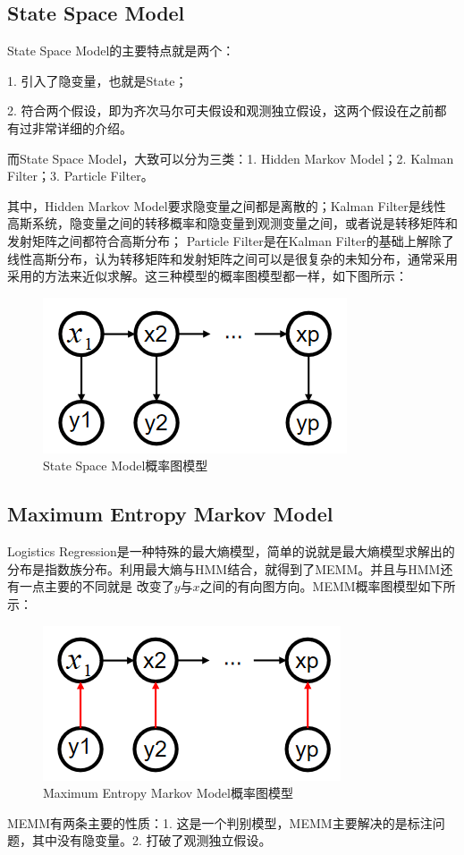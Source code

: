\documentclass[a4paper]{article}
\begin{document}
\subsection{State Space Model}
State Space Model的主要特点就是两个：

1. 引入了隐变量，也就是State；

2. 符合两个假设，即为齐次马尔可夫假设和观测独立假设，这两个假设在之前都有过非常详细的介绍。

而State Space Model，大致可以分为三类：1. Hidden Markov Model；2. Kalman Filter；3. Particle Filter。

其中，Hidden Markov Model要求隐变量之间都是离散的；Kalman Filter是线性高斯系统，隐变量之间的转移概率和隐变量到观测变量之间，或者说是转移矩阵和发射矩阵之间都符合高斯分布；
Particle Filter是在Kalman Filter的基础上解除了线性高斯分布，认为转移矩阵和发射矩阵之间可以是很复杂的未知分布，通常采用采用的方法来近似求解。这三种模型的概率图模型都一样，如下图所示：
\begin{figure}[H]
    \centering
    \includegraphics[width=.35\textwidth]{微信图片_20200229220207.png}
    \caption{State Space Model概率图模型}
    
\end{figure}

\subsection{Maximum Entropy Markov Model}
Logistics Regression是一种特殊的最大熵模型，简单的说就是最大熵模型求解出的分布是指数族分布。利用最大熵与HMM结合，就得到了MEMM。并且与HMM还有一点主要的不同就是
改变了$y$与$x$之间的有向图方向。MEMM概率图模型如下所示：
\begin{figure}[H]
    \centering
    \includegraphics[width=.35\textwidth]{微信图片_20200229215807.png}
    \caption{Maximum Entropy Markov Model概率图模型}
    
\end{figure}
MEMM有两条主要的性质：1. 这是一个判别模型，MEMM主要解决的是标注问题，其中没有隐变量。2. 打破了观测独立假设。
\end{document}

